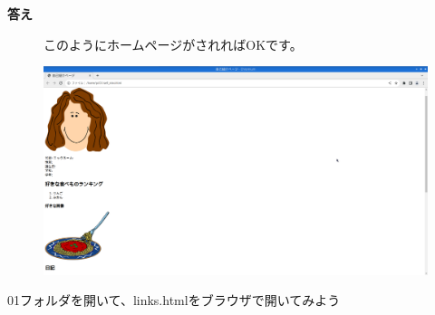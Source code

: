 \documentclass[a4paper,12pt]{jarticle}
\begin{document}
\bigskip

\clearpage
\textbf{答え}



\begin{figure}[hb]
  \centering
  \begin{minipage}{\textwidth}
    このようにホームページがされればOKです。

    \centering
    \includegraphics[width=\textwidth]{textbook-img142.png}
  \end{minipage}

\end{figure}
\theQuestion\label{Q:hasAnswer04-1}

01フォルダを開いて、links.htmlをブラウザで開いてみよう


\bigskip

\vfill
\end{document}
